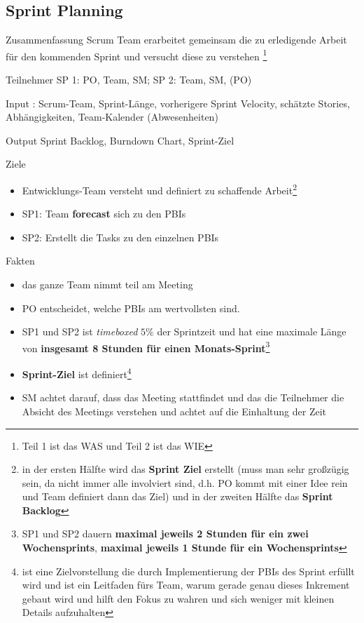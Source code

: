 \subsection{Sprint Planning}
\begin{Beschreibungfett}[Zusammenfassung]
\item [Zusammenfassung] Scrum Team erarbeitet gemeinsam die zu erledigende Arbeit für den kommenden
  Sprint und versucht diese zu verstehen \footnote{Teil 1 ist das WAS und Teil 2 ist das WIE}
  \item [Teilnehmer] SP 1: PO, Team, SM; SP 2: Team, SM, (PO)
  \item [Input]: Scrum-Team, Sprint-Länge, vorherigere Sprint Velocity, schätzte Stories, Abhängigkeiten, Team-Kalender (Abwesenheiten)
  \item [Output] Sprint Backlog, Burndown Chart, Sprint-Ziel
  \item [Ziele]
    \begin{itemize}
      \item Entwicklungs-Team versteht und definiert zu schaffende Arbeit\footnote{in der ersten Hälfte wird das
          \textbf{Sprint Ziel} erstellt (muss man sehr großzügig sein, da nicht immer alle
          involviert sind, d.h. PO kommt mit einer Idee rein und Team definiert dann das Ziel) und in der zweiten Hälfte das \textbf{Sprint Backlog}}
      \item SP1: Team \textbf{forecast} sich zu den PBIs
      \item SP2: Erstellt die Tasks zu den einzelnen PBIs
    \end{itemize}
  \item [Fakten]
  \begin{itemize}
    \item das ganze Team nimmt teil am Meeting
    \item PO entscheidet, welche PBIs am wertvollsten sind.
    \item SP1 und SP2 ist \textit{timeboxed} $5\%$ der Sprintzeit und hat eine maximale Länge von \textbf{insgesamt 8
        Stunden für einen Monats-Sprint}\footnote{SP1 und SP2 dauern \textbf{maximal jeweils 2 Stunden für ein zwei
          Wochensprints}, \textbf{maximal jeweils 1 Stunde für ein Wochensprints}}
    \item \textbf{Sprint-Ziel} ist definiert\footnote{ist eine
    Zielvorstellung die durch Implementierung der PBIs des Sprint erfüllt wird und ist ein
    Leitfaden fürs Team, warum gerade genau dieses Inkrement gebaut wird und hilft den  Fokus zu
    wahren und sich weniger mit kleinen Details aufzuhalten}
    \item SM achtet darauf, dass das Meeting stattfindet und das die Teilnehmer die Absicht
      des Meetings verstehen und achtet auf die Einhaltung der Zeit
  \end{itemize}
\end{Beschreibungfett}


